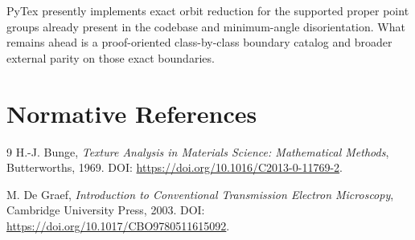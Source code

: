 \documentclass[11pt]{article}
\begin{document}
PyTex presently implements exact orbit reduction for the supported proper point groups already present in the codebase and minimum-angle disorientation. What remains ahead is a proof-oriented class-by-class boundary catalog and broader external parity on those exact boundaries.

\section{Normative References}

\begin{thebibliography}{9}
H.-J. Bunge,
\textit{Texture Analysis in Materials Science: Mathematical Methods},
Butterworths, 1969.
DOI: \url{https://doi.org/10.1016/C2013-0-11769-2}.

M. De Graef,
\textit{Introduction to Conventional Transmission Electron Microscopy},
Cambridge University Press, 2003.
DOI: \url{https://doi.org/10.1017/CBO9780511615092}.
\end{thebibliography}
\end{document}
